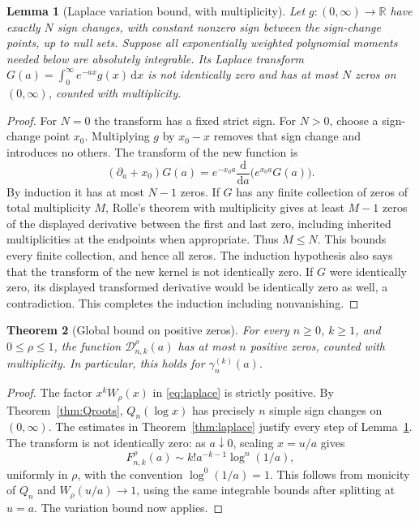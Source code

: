 \documentclass[11pt]{article}
\newtheorem{theorem}{Theorem}[section]
\newtheorem{lemma}[theorem]{Lemma}
\theoremstyle{definition}
\theoremstyle{remark}
\newcommand{\RR}{\mathbb R}
\newcommand{\dd}{\,\mathrm d}
\newcommand{\D}{\mathcal D}
\begin{document}
\begin{lemma}[Laplace variation bound, with multiplicity]\label{lem:variation}
Let $g:(0,\infty)\to\RR$ have exactly $N$ sign changes, with constant nonzero sign between the sign-change points, up to null sets. Suppose all exponentially weighted polynomial moments needed below are absolutely integrable. Its Laplace transform
$G(a)=\int_0^\infty e^{-ax}g(x)\dd x$ is not identically zero and has at most $N$ zeros on $(0,\infty)$, counted with multiplicity.
\end{lemma}
\begin{proof}
For $N=0$ the transform has a fixed strict sign. For $N>0$, choose a sign-change point $x_0$. Multiplying $g$ by $x_0-x$ removes that sign change and introduces no others. The transform of the new function is
\[
 (\partial_a+x_0)G(a)=e^{-x_0a}\frac{\mathrm d}{\mathrm da}\bigl(e^{x_0a}G(a)\bigr).
\]
By induction it has at most $N-1$ zeros. If $G$ has any finite collection of zeros of total multiplicity $M$, Rolle's theorem with multiplicity gives at least $M-1$ zeros of the displayed derivative between the first and last zero, including inherited multiplicities at the endpoints when appropriate. Thus $M\leq N$. This bounds every finite collection, and hence all zeros. The induction hypothesis also says that the transform of the new kernel is not identically zero. If $G$ were identically zero, its displayed transformed derivative would be identically zero as well, a contradiction. This completes the induction including nonvanishing.
\end{proof}

\begin{theorem}[Global bound on positive zeros]\label{thm:globalzeros}
For every $n\geq0$, $k\geq1$, and $0\leq\rho\leq1$, the function $\D_{n,k}^{\rho}(a)$ has at most $n$ positive zeros, counted with multiplicity. In particular, this holds for $\gamma_n^{(k)}(a)$.
\end{theorem}
\begin{proof}
The factor $x^kW_\rho(x)$ in \eqref{eq:laplace} is strictly positive. By Theorem~\ref{thm:Qroots}, $Q_n(\log x)$ has precisely $n$ simple sign changes on $(0,\infty)$. The estimates in Theorem~\ref{thm:laplace} justify every step of Lemma~\ref{lem:variation}. The transform is not identically zero: as $a\downarrow0$, scaling $x=u/a$ gives
\begin{equation}\label{eq:small-a}
 F_{n,k}^{\rho}(a)\sim k!a^{-k-1}\log^n(1/a),
\end{equation}
uniformly in $\rho$, with the convention $\log^0(1/a)=1$. This follows from monicity of $Q_n$ and $W_\rho(u/a)\to1$, using the same integrable bounds after splitting at $u=a$. The variation bound now applies.
\end{proof}
\end{document}
